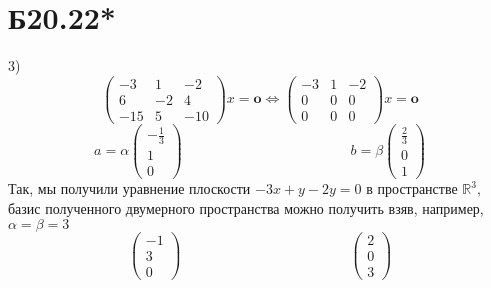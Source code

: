 \section*{Б20.22*}
3)$$\begin{pmatrix*}
-3&1&-2\\
6&-2&4\\
-15&5&-10
\end{pmatrix*}x=\textbf{o}\Leftrightarrow\begin{pmatrix*}
-3&1&-2\\
0&0&0\\
0&0&0
\end{pmatrix*}x=\textbf{o}$$$$a=\alpha\begin{pmatrix*}
-\frac{1}{3}\\
1\\
0
\end{pmatrix*}\qquad\qquad\qquad\qquad\qquad\qquad b=\beta\begin{pmatrix*}
\frac{2}{3}\\
0\\
1
\end{pmatrix*}$$
Так, мы получили уравнение плоскости $-3x+y-2y=0$ в пространстве $\mathbb{R}^3$, базис полученного двумерного пространства можно получить взяв, например, $\alpha=\beta=3$
$$\begin{pmatrix*}
-1\\
3\\
0
\end{pmatrix*}\qquad\qquad\qquad\qquad\qquad\qquad\begin{pmatrix*}
2\\
0\\
3
\end{pmatrix*}$$
